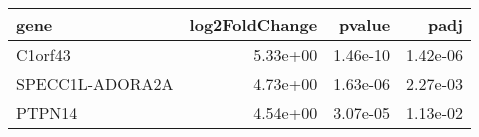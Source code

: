 \begin{tabular}{lrrr}
\toprule
           gene &  log2FoldChange &   pvalue &     padj \\
\midrule
        C1orf43 &        5.33e+00 & 1.46e-10 & 1.42e-06 \\
SPECC1L-ADORA2A &        4.73e+00 & 1.63e-06 & 2.27e-03 \\
         PTPN14 &        4.54e+00 & 3.07e-05 & 1.13e-02 \\
\bottomrule
\end{tabular}
